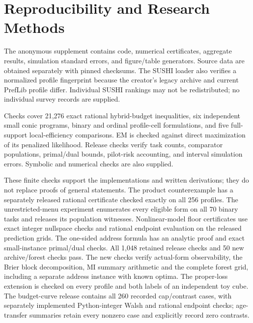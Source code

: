 \section{Reproducibility and Research Methods}\label{app:repro}
The anonymous supplement contains code, numerical certificates, aggregate
results, simulation standard errors, and figure/table generators. Source data
are obtained separately with pinned checksums. The SUSHI loader also verifies
a normalized profile fingerprint because the creator's legacy archive and
current PrefLib profile differ. Individual SUSHI rankings may not be
redistributed; no individual survey records are supplied.

Checks cover 21,276 exact rational hybrid-budget inequalities, six independent
small conic programs, binary and ordinal profile-cell formulations, and five
full-support local-efficiency comparisons. EM is checked against direct
maximization of its penalized likelihood. Release checks verify task counts,
comparator populations, primal/dual bounds, pilot-risk accounting, and
interval simulation errors. Symbolic and numerical checks are also supplied.

These finite checks support the implementations and written derivations;
they do not replace proofs of general statements. The product counterexample
has a separately released rational certificate checked exactly on all 256
profiles. The unrestricted-menu experiment enumerates every eligible form
on all 70 binary tasks and releases its population witnesses. Nonlinear-model
floor certificates use exact integer nullspace checks and rational endpoint
evaluation on the released prediction grids. The one-sided address formula
has an analytic proof and exact small-instance primal/dual checks.
All 1,048 retained release checks and 50 new archive/forest checks pass.
The new checks verify actual-form observability, the Brier block
decomposition, MI summary arithmetic and the complete forest grid,
including a separate address instance with known optima. The proper-loss extension is
checked on every profile and both labels of
an independent toy cube. The budget-curve release contains all 260
recorded cap/contrast cases, with separately implemented Python-integer
Walsh and rational endpoint checks; age-transfer summaries retain every
nonzero case and explicitly record zero contrasts.


